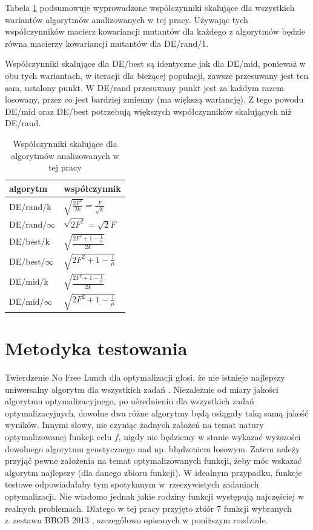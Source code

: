 \documentclass[a4paper,onecolumn,oneside,12pt,wide,floatssmall]{mwrep}
\theoremstyle{definition}
\theoremstyle{plain}%
\theoremstyle{remark}
\begin{document}
Tabela \ref{table:wspolczynniki} podsumowuje wyprowadzone współczynniki skalujące dla wszystkich
wariantów algorytmów analizowanych w tej pracy. Używając tych współczynników macierz kowariancji
mutantów dla każdego z algorytmów będzie równa macierzy kowariancji mutantów dla DE/rand/1.

Współczynniki skalujące dla DE/best są identyczne jak dla DE/mid, ponieważ w obu tych wariantach,
w iteracji dla bieżącej populacji, zawsze przesuwany jest ten sam, ustalony punkt. W DE/rand
przesuwany punkt jest za każdym razem losowany, przez co jest bardziej zmienny (ma większą wariancję).
Z tego powodu DE/mid oraz DE/best potrzebują większych współczynników skalujących niż DE/rand.

\begin{table}[H]
\centering
\begin{tabular}{ l | l }
algorytm         & współczynnik \\ \hline
DE/rand/k        & $\sqrt{\frac{2F^2}{2k}} = \frac{F}{\sqrt{k}}$ \\ 
DE/rand/$\infty$ & $\sqrt{2F^2} = \sqrt{2}F$ \\ \hline
DE/best/k        & $\sqrt{\frac{2F^2 + 1 - \frac{1}{\mu}}{2k}}$ \\
DE/best/$\infty$ & $\sqrt{2F^2 + 1 - \frac{1}{\mu}}$ \\ \hline
DE/mid/k         & $\sqrt{\frac{2F^2 + 1 - \frac{1}{\mu}}{2k}}$ \\
DE/mid/$\infty$  & $\sqrt{2F^2 + 1 - \frac{1}{\mu}}$ \\
\end{tabular}
\caption{Współczynniki skalujące dla algorytmów analizowanych w tej pracy}
\label{table:wspolczynniki}
\end{table}

\chapter{Metodyka testowania}
\label{chap:metodyka}

Twierdzenie No Free Lunch dla optymalizacji głosi, że nie istnieje najlepszy uniwersalny algorytm dla wszystkich zadań \cite{lunch}. 
Niezależnie od miary jakości algorytmu optymalizacyjnego, po uśrednieniu dla wszystkich zadań optymalizacyjnych, 
dowolne dwa różne algorytmy będą osiągały taką samą jakość wyników. Innymi słowy,
nie czyniąc żadnych założeń na temat natury optymalizowanej funkcji celu $f$, 
nigdy nie będziemy w stanie wykazać wyższości dowolnego algorytmu genetycznego nad np. błądzeniem losowym. 
Zatem należy przyjąć pewne założenia na temat optymalizowanych funkcji, żeby móc wskazać algorytm najlepszy (dla danego zbioru funkcji).
W idealnym przypadku, funkcje testowe odpowiadałaby tym spotykanym w~rzeczywistych zadaniach optymalizacji.
Nie wiadomo jednak jakie rodziny funkcji występują najczęściej w realnych problemach.
Dlatego w tej pracy przyjęto zbiór 7 funkcji wybranych z~zestawu BBOB 2013 \cite{noiseless}, szczegółowo opisanych w poniższym rozdziale.
\end{document}
